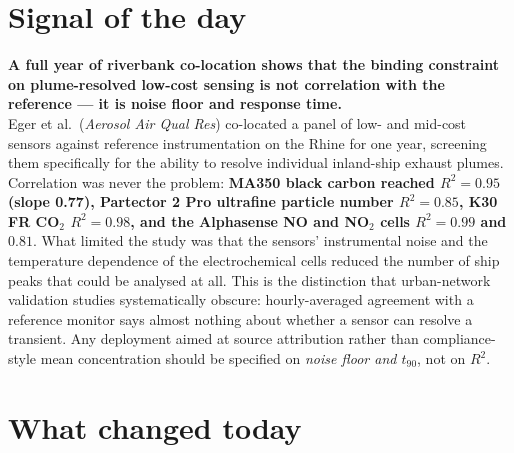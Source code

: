 \documentclass[10pt]{article}
\begin{document}
\vspace{6mm}

\section*{\sffamily\bfseries\color{Deep}Signal of the day}
\vspace{-1.5mm}{\color{Amber}\rule{\linewidth}{1.1pt}}\vspace{2.5mm}

\begin{keybox}
{\sffamily\bfseries\small\color{Deep}A full year of riverbank co-location shows that the
binding constraint on plume-resolved low-cost sensing is not correlation with the
reference --- it is noise floor and response time.}\\[1.4mm]
\footnotesize
Eger et al.\ (\textit{Aerosol Air Qual Res}) co-located a panel of low- and mid-cost
sensors against reference instrumentation on the Rhine for one year, screening them
specifically for the ability to resolve individual inland-ship exhaust plumes.
Correlation was never the problem: \textbf{MA350 black carbon reached $R^2=0.95$
(slope 0.77), Partector 2 Pro ultrafine particle number $R^2=0.85$, K30 FR CO$_2$
$R^2=0.98$, and the Alphasense NO and NO$_2$ cells $R^2=0.99$ and $0.81$}. What limited
the study was that the sensors' instrumental noise and the temperature dependence of
the electrochemical cells reduced the number of ship peaks that could be analysed at
all. This is the distinction that urban-network validation studies systematically
obscure: hourly-averaged agreement with a reference monitor says almost nothing about
whether a sensor can resolve a transient. Any deployment aimed at source attribution
rather than compliance-style mean concentration should be specified on
\emph{noise floor and $t_{90}$}, not on $R^2$.
\end{keybox}

\vspace{3mm}

\section*{\sffamily\bfseries\color{Deep}What changed today}
\vspace{-1.5mm}{\color{Amber}\rule{\linewidth}{1.1pt}}\vspace{2.5mm}
\end{document}
